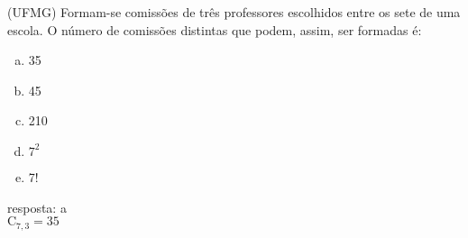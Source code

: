 \begin{ex}
 (UFMG) Formam-se comissões de três professores escolhidos entre os sete de uma escola. O número de comissões distintas que podem, assim, ser formadas é:
    \begin{enumerate}[(a)]
    \item 35
    \item 45
    \item 210
    \item $7^2$
    \item 7!
    \end{enumerate}
      \begin{sol}
       resposta: a \\
       $\mathrm{C}_{7,3}=35$
      \end{sol}
\end{ex}